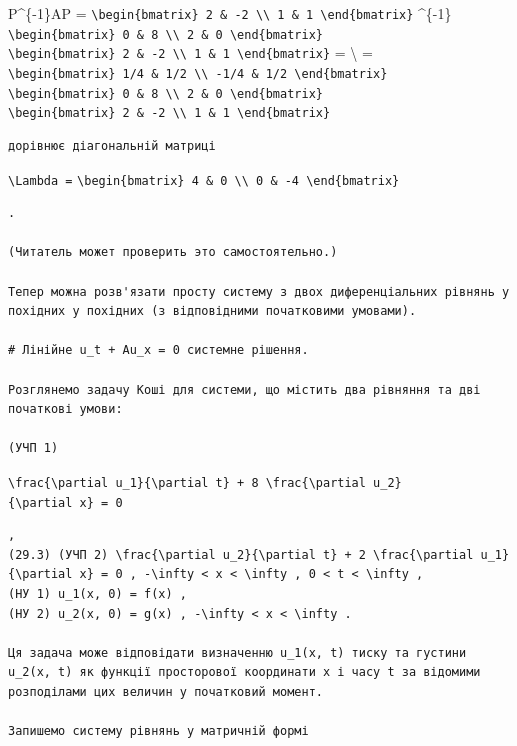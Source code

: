 \documentclass[
  ukrainian,
]{article}
\begin{document}
P\^{}\{-1\}AP =
\texttt{\textbackslash{}begin\{bmatrix\}\ 2\ \&\ -2\ \textbackslash{}\textbackslash{}\ 1\ \&\ 1\ \textbackslash{}end\{bmatrix\}}
\^{}\{-1\}
\texttt{\textbackslash{}begin\{bmatrix\}\ 0\ \&\ 8\ \textbackslash{}\textbackslash{}\ 2\ \&\ 0\ \textbackslash{}end\{bmatrix\}}
\texttt{\textbackslash{}begin\{bmatrix\}\ 2\ \&\ -2\ \textbackslash{}\textbackslash{}\ 1\ \&\ 1\ \textbackslash{}end\{bmatrix\}}
= \textbackslash{} =
\texttt{\textbackslash{}begin\{bmatrix\}\ 1/4\ \&\ 1/2\ \textbackslash{}\textbackslash{}\ -1/4\ \&\ 1/2\ \textbackslash{}end\{bmatrix\}}
\texttt{\textbackslash{}begin\{bmatrix\}\ 0\ \&\ 8\ \textbackslash{}\textbackslash{}\ 2\ \&\ 0\ \textbackslash{}end\{bmatrix\}}
\texttt{\textbackslash{}begin\{bmatrix\}\ 2\ \&\ -2\ \textbackslash{}\textbackslash{}\ 1\ \&\ 1\ \textbackslash{}end\{bmatrix\}}

\begin{verbatim}
дорівнює діагональній матриці
\end{verbatim}

\texttt{\textbackslash{}Lambda\ =}
\texttt{\textbackslash{}begin\{bmatrix\}\ 4\ \&\ 0\ \textbackslash{}\textbackslash{}\ 0\ \&\ -4\ \textbackslash{}end\{bmatrix\}}

\begin{verbatim}
.

(Читатель может проверить это самостоятельно.)

Тепер можна розв'язати просту систему з двох диференціальних рівнянь у похідних у похідних (з відповідними початковими умовами).

# Лінійне u_t + Au_x = 0 системне рішення.

Розглянемо задачу Коші для системи, що містить два рівняння та дві початкові умови:

(УЧП 1)
\end{verbatim}

\texttt{\textbackslash{}frac\{\textbackslash{}partial\ u\_1\}\{\textbackslash{}partial\ t\}\ +\ 8\ \textbackslash{}frac\{\textbackslash{}partial\ u\_2\}\{\textbackslash{}partial\ x\}\ =\ 0}

\begin{verbatim}
,  
(29.3) (УЧП 2) \frac{\partial u_2}{\partial t} + 2 \frac{\partial u_1}{\partial x} = 0 , -\infty < x < \infty , 0 < t < \infty ,  
(HУ 1) u_1(x, 0) = f(x) ,  
(HУ 2) u_2(x, 0) = g(x) , -\infty < x < \infty .

Ця задача може відповідати визначенню u_1(x, t) тиску та густини u_2(x, t) як функції просторової координати x і часу t за відомими розподілами цих величин у початковий момент.

Запишемо систему рівнянь у матричній формі
\end{verbatim}
\end{document}
